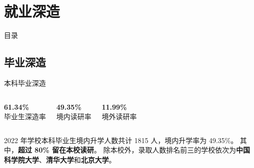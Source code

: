 \documentclass[aspectratio=169, utf8]{beamer}
\begin{document}
\section{就业深造}

\begin{frame}{目录}
    \begin{multicols}{2}
        \tableofcontents[currentsection]
    \end{multicols}
\end{frame}

\subsection*{毕业深造}

\begin{frame}{本科毕业深造}
    \begin{columns}
        \centering
        \LARGE\textcolor{Fore}{\textbf{61.34\%}}\\[0.5em]

        \normalsize 毕业生深造率

        \centering
        \LARGE\textcolor{Fore}{\textbf{49.35\%}}\\[0.5em]

        \normalsize 境内读研率

        \centering
        \LARGE\textcolor{Fore}{\textbf{11.99\%}}\\[0.5em]

        \normalsize 境外读研率
    \end{columns}

    \normalsize
    \vspace{1em}

    2022 年学校本科毕业生境内升学人数共计 1815 人，境内升学率为 49.35\%。
    其中，\textcolor{Fore}{\textbf{超过 80\% 留在本校读研}}。
    除本校外，录取人数排名前三的学校依次为\textcolor{Fore}{\textbf{中国科学院大学}}、\textcolor{Fore}{\textbf{清华大学}}和\textcolor{Fore}{\textbf{北京大学}}。
\end{frame}
\end{document}
